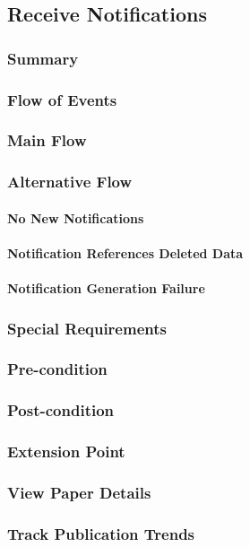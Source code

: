 \subsection{Receive Notifications}
\subsubsection{Summary}

\subsubsection{Flow of Events}
\subsubsection*{Main Flow}

\subsubsection*{Alternative Flow}
\paragraph{No New Notifications}

\paragraph{Notification References Deleted Data}

\paragraph{Notification Generation Failure}

\subsubsection{Special Requirements}

\subsubsection{Pre-condition}

\subsubsection{Post-condition}

\subsubsection{Extension Point}
\subsubsection*{View Paper Details}

\subsubsection*{Track Publication Trends}

